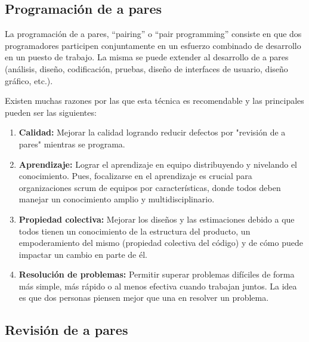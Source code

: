 \subsection{Programación de a pares}

La programación de a pares, “pairing” o “pair programming” consiste en que dos programadores participen conjuntamente en un esfuerzo combinado de desarrollo en un puesto de trabajo. La misma se puede extender al desarrollo de a pares (análisis, diseño, codificación, pruebas, diseño de interfaces de usuario, diseño gráfico, etc.).

Existen muchas razones por las que esta técnica es recomendable y las principales pueden ser las siguientes:

\begin{enumerate}

\item \textbf{Calidad:} Mejorar la calidad logrando reducir defectos por "revisión de a pares" mientras se programa.

\item \textbf{Aprendizaje:} Lograr el aprendizaje en equipo distribuyendo y nivelando el conocimiento. Pues, focalizarse en el aprendizaje es crucial para organizaciones scrum de equipos por características, donde todos deben manejar un conocimiento amplio y multidisciplinario. 

\item \textbf{Propiedad colectiva:}
Mejorar los diseños y las estimaciones debido a que todos tienen un conocimiento de la estructura del producto, un empoderamiento del mismo (propiedad colectiva del código) y de cómo puede impactar un cambio en parte de él.

\item \textbf{Resolución de problemas:} Permitir superar problemas difíciles de forma más simple, más rápido o al menos efectiva cuando trabajan juntos. La idea es que dos personas piensen mejor que una en resolver un problema.

\end{enumerate}

\subsection{Revisión de a pares}

